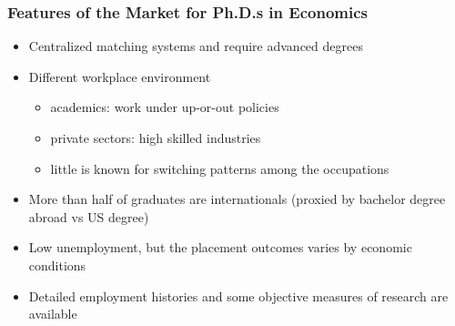 \documentclass[11pt]{beamer}
\begin{document}
\begin{frame}
	\frametitle{Features of the Market for Ph.D.s in Economics}
	\begin{itemize}
		
							    \item Centralized matching systems and require advanced degrees
							    \vspace{1.5mm}
							    \item Different workplace environment
							    \begin{itemize}
							    	\item academics: work under up-or-out policies
							    	\vspace{.5 mm} %
							    	\item private sectors:  high skilled industries
							 	    \vspace{.5 mm}
							 	    \item little is known for switching patterns among the occupations   
						     \end{itemize}
					     \vspace{1.5mm}
					     		\item More than half of graduates are internationals (proxied by bachelor degree abroad vs US degree)
			   				    \vspace{1.5mm}
			   				    \item Low unemployment, but the placement outcomes varies by economic conditions
			   				   \vspace{1.5mm}
			   				    \item Detailed employment histories and some objective measures of research are available
		
	\end{itemize}
\end{frame}
\end{document}

